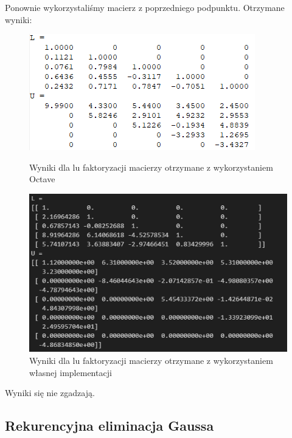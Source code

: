 \documentclass{article}
\begin{document}
Ponownie wykorzystaliśmy macierz z poprzedniego podpunktu. Otrzymane wyniki:

\begin{figure}[H]
  \begin{minipage}[b]{0.49\textwidth}
    \includegraphics[width=\textwidth]{images/octave_comparison_lu_octave.png}
    \caption{Wyniki dla lu faktoryzacji macierzy otrzymane z wykorzystaniem Octave}
  \end{minipage}
  \hfill
  \begin{minipage}[b]{0.49\textwidth}
    \includegraphics[width=\textwidth]{images/octave_comparison_lu_own.png}
    \caption{Wyniki dla lu faktoryzacji macierzy otrzymane z wykorzystaniem własnej implementacji}
  \end{minipage}
\end{figure}

\noindent
Wyniki się nie zgadzają.

\subsection{Rekurencyjna eliminacja Gaussa}
\end{document}
